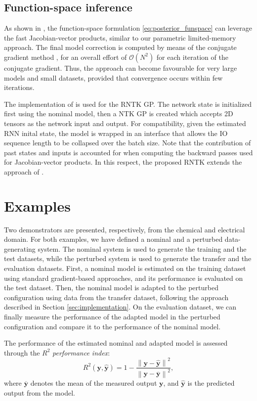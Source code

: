 \documentclass{article}
\newcommand{\tst}{{\rm{tst}}}
\newcommand{\norm}[1]{\left\lVert#1\right\rVert}
\newcommand{\tvec}[1]{{\mathbf{#1}}}
\begin{document}
\subsection{Function-space inference}
\label{sec:GP_func}
As shown in \cite{maddox2021fast}, the function-space formulation \eqref{eq:posterior_funspace} can leverage the fast Jacobian-vector products, similar to our parametric limited-memory approach.  The final model correction is computed by means of the conjugate gradient method \cite[Chapter~5]{nocedal2006numerical}, for an overall effort of $\mathcal{O}(N^2)$ for each iteration of the conjugate gradient. Thus, the approach can become favourable for very large models and small datasets, provided that convergence occurs within few iterations.   

The implementation of \cite{maddox2021fast} is used for the RNTK GP. The network state is initialized first using the nominal model, then a NTK GP is created which accepts 2D tensors as the network input and output. For compatibility, given the estimated RNN inital state, the model is wrapped in an interface that allows the IO sequence length to be collapsed over the batch size. Note that the  contribution of past states and inputs is accounted for when computing the backward passes used for Jacobian-vector products. In this respect, the proposed RNTK extends the approach of \cite{maddox2021fast}. 


\section{Examples} 
\label{sec:experiments}
Two demonstrators are presented, respectively, from the chemical and electrical domain. 
For both examples, we have defined a nominal and a perturbed data-generating system.
The nominal system is used to generate the training and the test datasets, while the perturbed system 
is used to generate the transfer and the evaluation datasets. First, a nominal model is estimated on 
the training dataset using standard gradient-based approaches, and its performance is evaluated on the test dataset. 
Then, the nominal model is adapted to the perturbed configuration using data from the transfer dataset, following the approach described in Section \ref{sec:implementation}.
On the evaluation dataset, we can finally measure the performance of the adapted model in the perturbed configuration and compare it to the 
performance of the nominal model.


The performance of the estimated nominal and adapted model is  assessed 
through  the    $R^2$  \emph{performance index}:
\begin{equation}
    R^{2}(\tvec{y}, \hat{\tvec{y}}) = 1 - \frac{\norm{\tvec{y} - \hat{\tvec{y}} }^2 } {{\norm{\tvec{y} - \overline{\tvec{y}}}^2}},
\end{equation}
where $\overline{\tvec{y}}$ denotes the  mean of the measured output $\tvec{y}$, and $\hat{\tvec{y}}$ is the predicted output from the model. 
\end{document}
